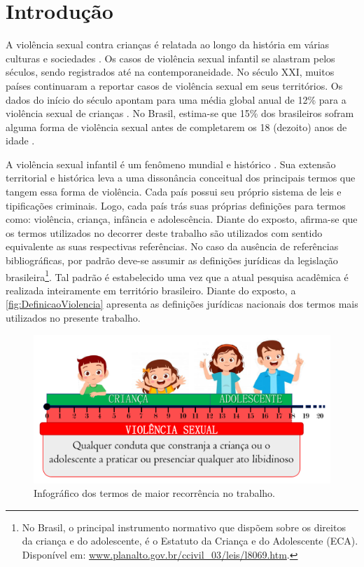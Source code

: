 \chapter{Introdução}\label{ch:Introducao}

A violência sexual contra crianças é relatada ao longo da história em várias culturas e sociedades \cite{walker1988physically, aded2006abuso}. Os casos de violência sexual infantil se alastram pelos séculos, sendo registrados até na contemporaneidade. No século XXI, muitos países continuaram a reportar casos de violência sexual em seus territórios. Os dados do início do século apontam para uma média global anual de 12\% para a violência sexual de crianças \cite{stoltenborgh2011global, azzopardi2019meta}. No Brasil, estima-se que 15\% dos brasileiros sofram alguma forma de violência sexual antes de completarem os 18 (dezoito) anos de idade .

A violência sexual infantil é um fenômeno mundial e histórico \cite{pinto2017avaliaccao}. Sua extensão territorial e histórica leva a uma dissonância conceitual dos principais termos que tangem essa forma de violência. Cada país possui seu próprio sistema de leis e tipificações criminais. Logo, cada país trás suas próprias definições para termos como: violência, criança, infância e adolescência. Diante do exposto, afirma-se que os termos utilizados no decorrer deste trabalho são utilizados com sentido equivalente as suas respectivas referências. No caso da ausência de referências bibliográficas, por padrão deve-se assumir as definições jurídicas da legislação brasileira\footnote{No Brasil, o principal instrumento normativo que dispõem sobre os direitos da criança e do adolescente, é o Estatuto da Criança e do Adolescente (ECA). Disponível em: \url{www.planalto.gov.br/ccivil_03/leis/l8069.htm}.}. Tal padrão é estabelecido uma vez que a atual pesquisa acadêmica é realizada inteiramente em território brasileiro. Diante do exposto, a \autoref{fig:DefinicaoViolencia} apresenta as definições jurídicas nacionais dos termos mais utilizados no presente trabalho.

\begin{figure}[!h]
	\centering
	\caption{Infográfico dos termos de maior recorrência no trabalho.}\label{fig:DefinicaoViolencia}
	\vspace{0.5cm}
	\includegraphics[width=\textwidth]{./Visuais/DefinicaoViolencia.pdf}
\end{figure}

